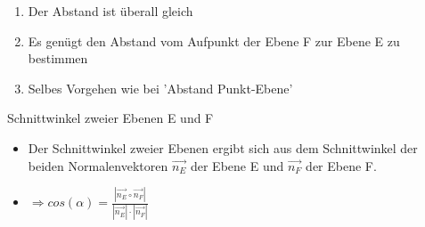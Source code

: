 \documentclass[paper=a6,landscape,ngerman,twoside=true,fontsize=12pt]{scrartcl}
\begin{document}
\begin{antwort} 
	\begin{enumerate} 
		\item Der Abstand ist überall gleich
		\item Es genügt den Abstand vom Aufpunkt der Ebene F zur Ebene E zu bestimmen
		\item Selbes Vorgehen wie bei 'Abstand Punkt-Ebene'	
	\end{enumerate} 
	
\end{antwort}
\begin{frage}
	Schnittwinkel zweier Ebenen E und F	
	
\end{frage}
\begin{antwort}
	
	\Large	
	\begin{itemize} 
		\item Der Schnittwinkel zweier Ebenen ergibt sich aus dem Schnittwinkel der beiden Normalenvektoren $\vec{n_E}$ der Ebene E und $\vec{n_F}$ der Ebene F.  
		\item $\Rightarrow cos(\alpha)=\frac{|\vec{n_E} \circ \vec{n_F}|}{|\vec{n_E}|\cdot|\vec{n_F}|}$
	\end{itemize} 	
\end{antwort}
\end{document}

